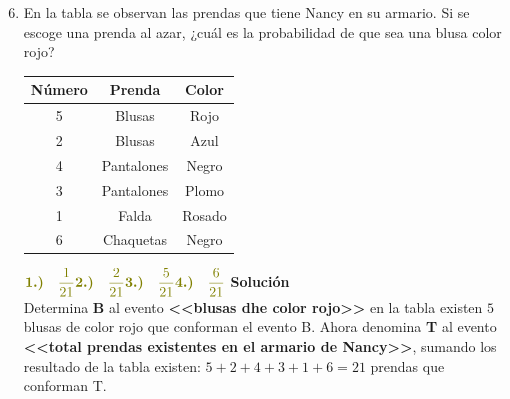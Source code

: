 \documentclass[11pt, a4paper]{article} %
\theoremstyle{dotlessP}
\theoremstyle{dotlessS}
\begin{document}
\begin{enumerate}[label=\color{dg}\theenumi.]
 \setcounter{enumi}{5}
  \normalsize
   \item {\color{db}En la tabla se observan las 			prendas que tiene Nancy en su armario. Si se 			escoge 	una prenda al azar, ¿cuál es la 				probabilidad de que 	sea una blusa color rojo?
        }
        
	\begin{table}[htbp]
		\centering
		\label{my-label}
	\begin{tabular}{|c|c|c|}
		\hline
		\textbf{Número} & \textbf{Prenda} & 					\textbf{Color} \\ \hline
		5               & Blusas          & Rojo         		  \\ \hline
		2               & Blusas          & Azul          		 \\ \hline
		4               & Pantalones      & Negro          \\ 		\hline
		3               & Pantalones      & Plomo          \\ 		\hline
		1               & Falda           & Rosado         \\ 		\hline
		6               & Chaquetas       & Negro          \\ 		\hline
	\end{tabular}
	\end{table}
    \(
     {\color{dh} \textbf{1.)} \quad \dfrac{1}{21}} \vspace{1\baselineskip} \\ 	
     {\color{dh} \textbf{2.)} \quad \dfrac{2}{21}} \vspace{1\baselineskip} \\ 	
     {\color{dh} \textbf{3.)} \quad \dfrac{5}{21}} \vspace{1\baselineskip} \\ 	
     {\color{dh} \textbf{4.)} \quad \dfrac{6}{21}}   \vspace{1\baselineskip} \\ 	
      \)
      \textbf{Solución} \\
    Determina \textbf{B} al evento \textbf{<<blusas dhe 			color rojo>>} en la tabla existen \(5\) blusas de color 	rojo que conforman el evento B. Ahora denomina \textbf{T} 		al evento \textbf{<<total prendas existentes en el 		armario de Nancy>>}, sumando los resultado de la tabla 		existen: \(5 + 2 + 4 + 3 + 1 + 6 = 21\) prendas que 		conforman T.

\end{enumerate}
\end{document}

